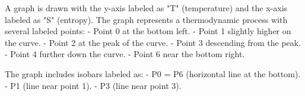 A graph is drawn with the y-axis labeled as "T" (temperature) and the x-axis labeled as "S" (entropy). The graph represents a thermodynamic process with several labeled points:  
- Point 0 at the bottom left.  
- Point 1 slightly higher on the curve.  
- Point 2 at the peak of the curve.  
- Point 3 descending from the peak.  
- Point 4 further down the curve.  
- Point 6 near the bottom right.  

The graph includes isobars labeled as:  
- P0 = P6 (horizontal line at the bottom).  
- P1 (line near point 1).  
- P3 (line near point 3).